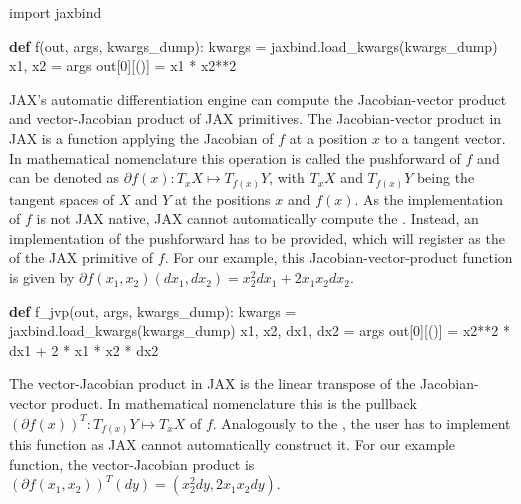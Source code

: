 \documentclass[10pt,a4paper,onecolumn]{article}
\let\textttOrig=\texttt
\def\texttt#1{\expandafter\textttOrig{\seqsplit{#1}}}
\newenvironment{Shaded}{}{}
\newcommand{\DecValTok}[1]{\textcolor[rgb]{0.25,0.63,0.44}{#1}}
\newcommand{\ImportTok}[1]{#1}
\newcommand{\KeywordTok}[1]{\textcolor[rgb]{0.00,0.44,0.13}{\textbf{#1}}}
\newcommand{\NormalTok}[1]{#1}
\newcommand{\OperatorTok}[1]{\textcolor[rgb]{0.40,0.40,0.40}{#1}}
\begin{document}
\begin{Shaded}
\begin{Highlighting}[]
\ImportTok{import}\NormalTok{ jaxbind}

\KeywordTok{def}\NormalTok{ f(out, args, kwargs\_dump):}
\NormalTok{    kwargs }\OperatorTok{=}\NormalTok{ jaxbind.load\_kwargs(kwargs\_dump)}
\NormalTok{    x1, x2 }\OperatorTok{=}\NormalTok{ args}
\NormalTok{    out[}\DecValTok{0}\NormalTok{][()] }\OperatorTok{=}\NormalTok{ x1 }\OperatorTok{*}\NormalTok{ x2}\OperatorTok{**}\DecValTok{2}
\end{Highlighting}
\end{Shaded}

JAX's automatic differentiation engine can compute the Jacobian-vector
product \texttt{jvp} and vector-Jacobian product \texttt{vjp} of JAX
primitives. The Jacobian-vector product in JAX is a function applying
the Jacobian of \(f\) at a position \(x\) to a tangent vector. In
mathematical nomenclature this operation is called the pushforward of
\(f\) and can be denoted as \(\partial f(x): T_x X \mapsto T_{f(x)} Y\),
with \(T_x X\) and \(T_{f(x)} Y\) being the tangent spaces of \(X\) and
\(Y\) at the positions \(x\) and \(f(x)\). As the implementation of
\(f\) is not JAX native, JAX cannot automatically compute the
\texttt{jvp}. Instead, an implementation of the pushforward has to be
provided, which \texttt{JAXbind} will register as the \texttt{jvp} of
the JAX primitive of \(f\). For our example, this
Jacobian-vector-product function is given by
\(\partial f(x_1,x_2)(dx_1,dx_2) = x_2^2dx_1 + 2x_1x_2dx_2\).

\begin{Shaded}
\begin{Highlighting}[]
\KeywordTok{def}\NormalTok{ f\_jvp(out, args, kwargs\_dump):}
\NormalTok{    kwargs }\OperatorTok{=}\NormalTok{ jaxbind.load\_kwargs(kwargs\_dump)}
\NormalTok{    x1, x2, dx1, dx2 }\OperatorTok{=}\NormalTok{ args}
\NormalTok{    out[}\DecValTok{0}\NormalTok{][()] }\OperatorTok{=}\NormalTok{ x2}\OperatorTok{**}\DecValTok{2} \OperatorTok{*}\NormalTok{ dx1 }\OperatorTok{+} \DecValTok{2} \OperatorTok{*}\NormalTok{ x1 }\OperatorTok{*}\NormalTok{ x2 }\OperatorTok{*}\NormalTok{ dx2}
\end{Highlighting}
\end{Shaded}

The vector-Jacobian product \texttt{vjp} in JAX is the linear transpose
of the Jacobian-vector product. In mathematical nomenclature this is the
pullback \((\partial f(x))^{T}: T_{f(x)}Y \mapsto T_x X\) of \(f\).
Analogously to the \texttt{jvp}, the user has to implement this function
as JAX cannot automatically construct it. For our example function, the
vector-Jacobian product is
\((\partial f(x_1,x_2))^{T}(dy) = (x_2^2dy, 2x_1x_2dy)\).
\end{document}
